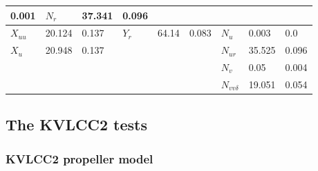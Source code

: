 \documentclass[review]{elsarticle}
\begin{document}
\begin{savenotes}
\begin{tabulary}{\linewidth}[t]{|T|T|T|T|T|T|T|T|T|}
 0.001
 &
 
 \( N_{r} \)
 &
 
 \sphinxhyphen{}37.341
 &
 
 0.096
 \\
 \hline
 
 \( X_{uu} \)
 &
 
 20.124
 &
 
 0.137
 &
 
 \( Y_{r} \)
 &
 
 64.14
 &
 
 0.083
 &
 
 \( N_{u} \)
 &
 
 \sphinxhyphen{}0.003
 &
 
 0.0
 \\
 \hline
 
 \( X_{u} \)
 &
 
 \sphinxhyphen{}20.948
 &
 
 0.137
 &&&&
 
 \( N_{ur} \)
 &
 
 35.525
 &
 
 0.096
 \\
 \hline&&&&&&
 
 \( N_{v} \)
 &
 
 \sphinxhyphen{}0.05
 &
 
 0.004
 \\
 \hline&&&&&&
 
 \( N_{vv\delta} \)
 &
 
 \sphinxhyphen{}19.051
 &
 
 0.054
 \\
 \hline
 \end{tabulary}
 \par
 \sphinxattableend\end{savenotes}


\subsection{The KVLCC2 tests}
\label{\detokenize{06.20_results_kvlcc2:kvlcc2-tests}}\label{\detokenize{06.20_results_kvlcc2::doc}}

\subsubsection{KVLCC2 propeller model}
\label{\detokenize{06.20_results_kvlcc2:kvlcc2-propeller-model}}\label{\detokenize{06.20_results_kvlcc2:results-propeller-model}}
  
\end{document}
